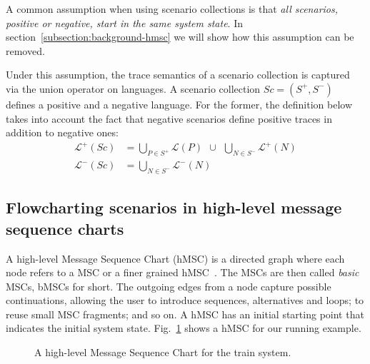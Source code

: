 A common assumption when using scenario collections is that \emph{all scenarios, positive or negative, start in the same system state}. In section~\ref{subsection:background-hmsc} we will show how this assumption can be removed.

Under this assumption, the trace semantics of a scenario collection is captured via the union operator on languages. A scenario collection $Sc = (S^+,S^-)$ defines a positive and a negative language. For the former, the definition below takes into account the fact that negative scenarios define positive traces in addition to negative ones:
\begin{align*}
\mathcal{L}^+(Sc) &= \bigcup_{P \in S^+} \mathcal{L}(P)~~\cup~~\bigcup_{N \in S^{-}} \mathcal{L}^{+}(N) \\
\mathcal{L}^-(Sc) &= \bigcup_{N \in S^-} \mathcal{L}^{-}(N)
\end{align*}

\subsection{Flowcharting scenarios in high-level message sequence charts\label{subsection:background-hmsc}}

A high-level Message Sequence Chart (hMSC) is a directed graph where each node refers to a MSC or a finer grained hMSC~\cite{ITU:1996}. The MSCs are then called \emph{basic} MSCs, bMSCs for short. The outgoing edges from a node capture possible continuations, allowing the user to introduce sequences, alternatives and loops; to reuse small MSC fragments; and so on. A hMSC has an initial starting point that indicates the initial system state. Fig.~\ref{image:train-hmsc} shows a hMSC for our running example.

\vspace{0.4cm}
\begin{figure}[H]\centering
{}
\caption{A high-level Message Sequence Chart for the train system.\label{image:train-hmsc}}
\end{figure}

